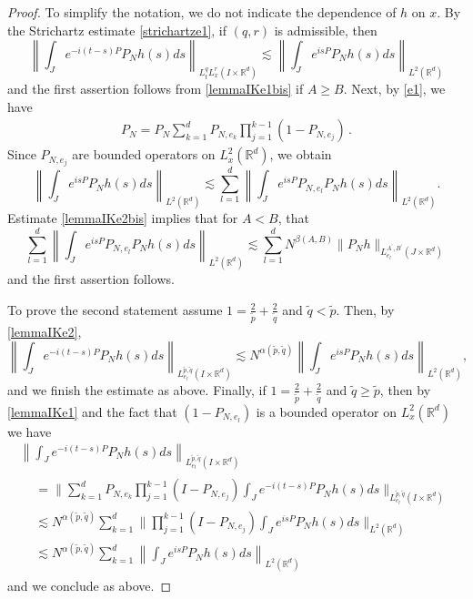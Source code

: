 \documentclass[10pt,leqno]{amsart}
\newcommand{\R}{\mathbb{R}}
\numberwithin{equation}{section}
\begin{document}
\begin{proof}
To simplify the notation, we do not indicate the dependence of $h$ on $x$. 
By the Strichartz estimate \eqref{strichartze1}, if $(q,r)$ is admissible, then
$$\left\|\int_J e^{-i(t-s) P} P_N h(s) ds\right\|_{L_t^q L_x^r (I\times \R^d)} \lesssim \left\|\int_J e^{is P } P_N h(s) ds\right\|_{L^2 (\R^d)} $$
and the first assertion follows from \eqref{lemmaIKe1bis} if $A \geq B$.
Next, by \eqref{e1}, we have
\begin{align*}
P_N 
= P_{N} \sum_{k = 1}^d P_{N, e_k} \prod_{j = 1}^{k - 1}(1 - P_{N, e_j}) \,.
\end{align*}
Since $P_{N,e_j}$ are bounded operators on $L^2_x (\R^d )$, we obtain  
$$
\left\|\int_J e^{is P } P_N h(s) ds\right\|_{L^2 (\R^d )} \lesssim \sum^{d}_{l=1}\left\|\int_J e^{is P} P_{N,e_l} P_N h(s) ds\right\|_{L^2 (\R^d )}.
$$
 Estimate \eqref{lemmaIKe2bis} implies that for $ A < B$, that 
$$\sum_{l=1}^d  \left\|\int_J e^{is P} P_{N,e_l} P_N h(s) ds \right\|_{L^2 (\R^d )} \lesssim \sum_{l=1}^d N^{\beta (A,B)} \|P_N h\|_{L_{e_l}^{A^\prime ,B^\prime} (J\times \R^d )}$$
and the first assertion follows. 


To prove the second statement assume $1= \frac{2}{\tilde{p}} +\frac{2}{\tilde{q}}$ and $\tilde{q} < \tilde{p}$. Then, by 
\eqref{lemmaIKe2}, 
\begin{equation}
\label{line1}
\left\|\int_J e^{-i(t-s) P} P_N h(s) ds \right\|_{L_{e_l}^{\tilde p, \tilde q} (I\times \R^d)}\lesssim N^{\alpha ( \tilde{p},\tilde q)}  \left\|\int_J e^{is P } P_N h(s) ds \right \|_{L^2 (\R^d)} ,
\end{equation}
and we finish the estimate as above. Finally, if $1= \frac{2}{\tilde{p}} +\frac{2}{\tilde{q}}$ and $\tilde{q} \geq \tilde{p}$, then by \eqref{lemmaIKe1} and the fact that $(1-P_{N,e_l})$ is a bounded operator on $L^2_x (\R^d )$ we have 
\begin{multline*}
\left\|\int_J e^{-i(t-s) P} P_N h(s) ds \right\|_{L_{e_l}^{\tilde p, \tilde q} (I\times \R^d)} \\
\begin{aligned}
&=  \Bigg\| \sum_{k = 1}^d P_{N, e_k} \prod_{j = 1}^{k-1} (I - P_{N, e_{j}}) \int_J e^{-i(t -s) P } P_N h(s) ds \Bigg\|_{L_{e_l}^{\tilde p, \tilde q} (I\times \R^d)} \\
&\lesssim N^{\alpha ( \tilde{p},\tilde q)} \sum_{k = 1}^d  \bigg\|  \prod_{j = 1}^{k-1} (I - P_{N, e_{j}}) \int_J e^{is P } P_N h(s) ds \bigg \|_{L^2 (\R^d)} \\
&\lesssim N^{\alpha ( \tilde{p},\tilde q)} \sum_{k = 1}^d  \left\| \int_J e^{is P } P_N h(s) ds \right \|_{L^2 (\R^d)}
\end{aligned}
\end{multline*}
and we conclude as above. 
\end{proof}
\end{document}
